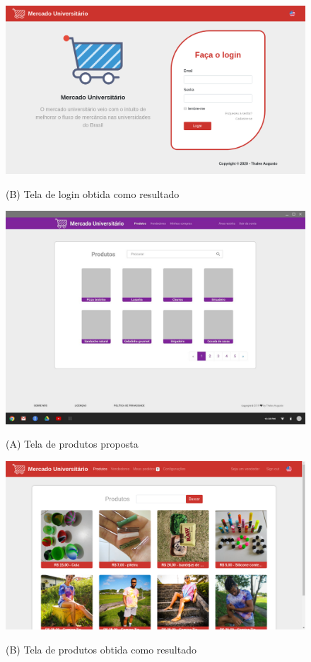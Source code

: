\begin{figure}[htbp!]
  \centering
  \caption{(B) Tela de login obtida como resultado}
  \includegraphics[width=1\textwidth]{figs/resultado/login.png}
    \label{fig:err}
\end{figure}

\begin{figure}[htbp!]
  \centering
  \caption{(A) Tela de produtos proposta}
  \includegraphics[width=1\textwidth]{figs/mockup/produtos.jpg}
    \label{fig:err}
\end{figure}

\begin{figure}[htbp!]
  \centering
  \caption{(B) Tela de produtos obtida como resultado}
  \includegraphics[width=1\textwidth]{figs/resultado/produtos.png}
    \label{fig:err}
\end{figure}

